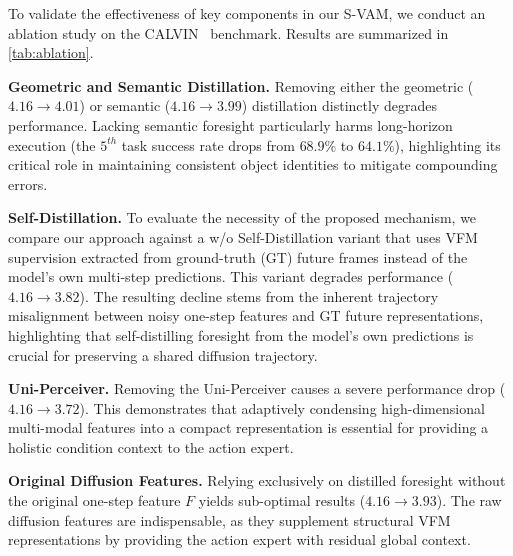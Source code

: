 
\label{sec:ablation}

To validate the effectiveness of key components in our S-VAM, we conduct an ablation study on the CALVIN~\cite{mees2022calvin} benchmark. Results are summarized in \cref{tab:ablation}.

\noindent \textbf{Geometric and Semantic Distillation.} 
Removing either the geometric ($4.16 \rightarrow 4.01$) or semantic ($4.16 \rightarrow 3.99$) distillation distinctly degrades performance. Lacking semantic foresight particularly harms long-horizon execution (the $5^{th}$ task success rate drops from $68.9\%$ to $64.1\%$), highlighting its critical role in maintaining consistent object identities to mitigate compounding errors.

\noindent \textbf{Self-Distillation.} To evaluate the necessity of the proposed mechanism, we compare our approach against a w/o Self-Distillation variant that uses VFM supervision extracted from ground-truth (GT) future frames instead of the model's own multi-step predictions. This variant degrades performance ($4.16 \rightarrow 3.82$). The resulting decline stems from the inherent trajectory misalignment between noisy one-step features and GT future representations, highlighting that self-distilling foresight from the model's own predictions is crucial for preserving a shared diffusion trajectory.

\noindent \textbf{Uni-Perceiver.} 
Removing the Uni-Perceiver causes a severe performance drop ($4.16 \rightarrow 3.72$). This demonstrates that adaptively condensing high-dimensional multi-modal features into a compact representation is essential for providing a holistic condition context to the action expert.

\noindent \textbf{Original Diffusion Features.} 
Relying exclusively on distilled foresight without the original one-step feature $F$ yields sub-optimal results ($4.16 \rightarrow 3.93$). The raw diffusion features are indispensable, as they supplement structural VFM representations by providing the action expert with residual global context.


